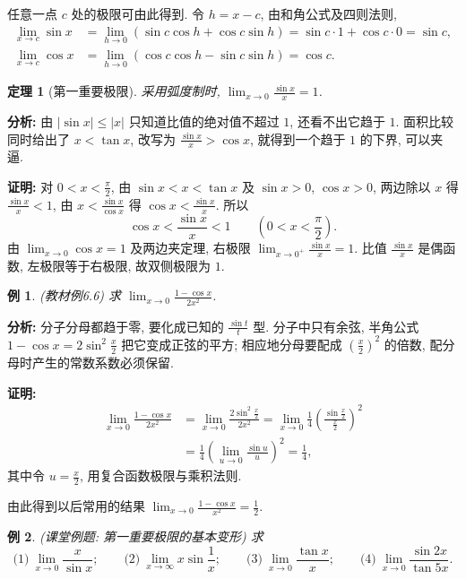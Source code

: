 \documentclass[UTF8,openany]{ctexbook}
\theoremstyle{chinesetextbook}
\newtheorem{example}{例}[section]
\newtheorem{theorem}{定理}[section]
\newenvironment{cnproof}{\par\indent\textbf{证明:} \ignorespaces}{\par}
\begin{document}
任意一点 $c$ 处的极限可由此得到. 令 $h=x-c$, 由和角公式及四则法则,
\[
\begin{aligned}
\lim_{x\to c}\sin x
&=\lim_{h\to0}(\sin c\cos h+\cos c\sin h)=\sin c\cdot1+\cos c\cdot0=\sin c,\\
\lim_{x\to c}\cos x
&=\lim_{h\to0}(\cos c\cos h-\sin c\sin h)=\cos c.
\end{aligned}
\]
\begin{theorem}[第一重要极限]
采用弧度制时, $\displaystyle \lim_{x\to0}\frac{\sin x}{x}=1$.
\end{theorem}
\par\indent\textbf{分析:} 由 $|\sin x|\le|x|$ 只知道比值的绝对值不超过 $1$, 还看不出它趋于 $1$. 面积比较同时给出了 $x<\tan x$, 改写为 $\displaystyle\frac{\sin x}x>\cos x$, 就得到一个趋于 $1$ 的下界, 可以夹逼.
\begin{cnproof}
对 $\displaystyle0<x<\frac\pi2$, 由 $\sin x<x<\tan x$ 及 $\sin x>0$, $\cos x>0$, 两边除以 $x$ 得 $\displaystyle\frac{\sin x}x<1$, 由 $\displaystyle x<\frac{\sin x}{\cos x}$ 得 $\displaystyle\cos x<\frac{\sin x}x$. 所以
\[
\cos x<\frac{\sin x}x<1\qquad\left(0<x<\frac\pi2\right).
\]
由 $\displaystyle\lim_{x\to0}\cos x=1$ 及两边夹定理, 右极限 $\displaystyle\lim_{x\to0^+}\frac{\sin x}x=1$. 比值 $\displaystyle\frac{\sin x}x$ 是偶函数, 左极限等于右极限, 故双侧极限为 $1$.
\end{cnproof}
\begin{example}
\textnormal{(教材例6.6)} 求 $\displaystyle \lim_{x\to0}\frac{1-\cos x}{2x^2}$.
\end{example}
\par\indent\textbf{分析:} 分子分母都趋于零, 要化成已知的 $\displaystyle\frac{\sin t}t$ 型. 分子中只有余弦, 半角公式 $1-\cos x=2\sin^2\frac x2$ 把它变成正弦的平方; 相应地分母要配成 $\displaystyle\left(\frac x2\right)^2$ 的倍数, 配分母时产生的常数系数必须保留.
\begin{cnproof}
\[
\begin{aligned}
\lim_{x\to0}\frac{1-\cos x}{2x^2}
&=\lim_{x\to0}\frac{2\sin^2\frac x2}{2x^2}
=\lim_{x\to0}\frac14\left(\frac{\sin\frac x2}{\frac x2}\right)^2\\
&=\frac14\left(\lim_{u\to0}\frac{\sin u}{u}\right)^2=\frac14,
\end{aligned}
\]
其中令 $\displaystyle u=\frac x2$, 用复合函数极限与乘积法则.
\end{cnproof}
由此得到以后常用的结果 $\displaystyle\lim_{x\to0}\frac{1-\cos x}{x^2}=\frac12$.
\begin{example}
\textnormal{(课堂例题: 第一重要极限的基本变形)} 求
\[
\text{(1)}\ \lim_{x\to0}\frac{x}{\sin x};\qquad
\text{(2)}\ \lim_{x\to\infty}x\sin\frac1x;\qquad
\text{(3)}\ \lim_{x\to0}\frac{\tan x}{x};\qquad
\text{(4)}\ \lim_{x\to0}\frac{\sin2x}{\tan5x}.
\]
\end{example}
\end{document}
